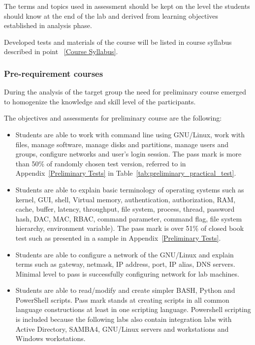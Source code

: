 The terms and topics used in assessment should be kept on the level the students should know at the end of the lab and derived from learning objectives established in analysis phase.

Developed tests and materials of the course will be listed in course syllabus described in point ~\ref{Course Syllabus}.

\subsubsection{Pre-requirement courses}

During the analysis of the target group the need for preliminary course emerged to homogenize the knowledge and skill level of the participants.

The objectives and assessments for preliminary course are the following:
\begin{itemize}
\item Students are able to work with command line using GNU/Linux, work with files, manage software, manage disks and partitions, manage users and groups, configure networks and user's login session.  The pass mark is more than 50\% of randomly chosen test version, referred to in   Appendix~\ref{Preliminary Tests} in Table~\ref{tab:preliminary_practical_test}.
\item Students are able to explain basic terminology of operating systems such as kernel, GUI, shell, Virtual memory, authentication, authorization, RAM, cache, buffer, latency, throughput, file system, process, thread, password hash, DAC, MAC, RBAC, command parameter, command flag, file system hierarchy, environment variable). The pass mark is over 51\% of closed book test such as presented in a sample in  Appendix~\ref{Preliminary Tests}.
\item Students are able to configure a network of the GNU/Linux and explain terms
such as gateway, netmask, IP address, port, IP alias, DNS servers. Minimal level
to pass is successfully configuring network for lab machines.
\item Students are able to read/modify and create simpler BASH, Python and PowerShell scripts. Pass mark stands at creating scripts in all common language constructions at least in one scripting language. Powershell scripting is included because the following labs also contain integration labs with Active Directory, SAMBA4, GNU/Linux servers and workstations and Windows workstations.
\end{itemize}

